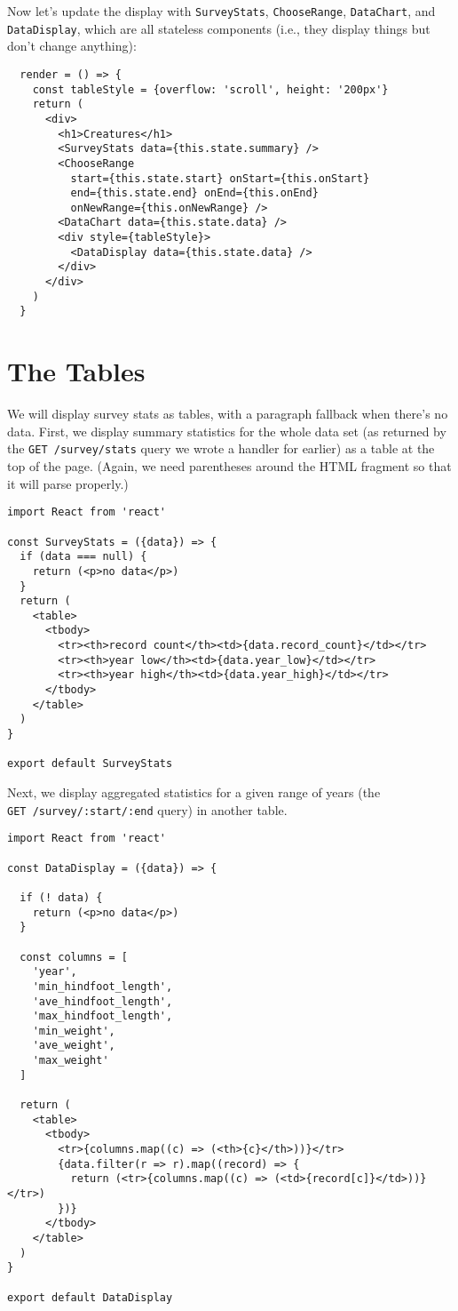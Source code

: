 Now let's update the display with \texttt{SurveyStats},
\texttt{ChooseRange}, \texttt{DataChart}, and \texttt{DataDisplay},
which are all stateless components
(i.e., they display things but don't change anything):

\begin{verbatim}
  render = () => {
    const tableStyle = {overflow: 'scroll', height: '200px'}
    return (
      <div>
        <h1>Creatures</h1>
        <SurveyStats data={this.state.summary} />
        <ChooseRange
          start={this.state.start} onStart={this.onStart}
          end={this.state.end} onEnd={this.onEnd}
          onNewRange={this.onNewRange} />
        <DataChart data={this.state.data} />
        <div style={tableStyle}>
          <DataDisplay data={this.state.data} />
        </div>
      </div>
    )
  }
\end{verbatim}

\section{The Tables}\label{s:capstone-tables}

We will display survey stats as tables,
with a paragraph fallback when there's no data.
First, we display summary statistics for the whole data set
(as returned by the \texttt{GET\ /survey/stats} query we wrote a handler for earlier)
as a table at the top of the page.
(Again, we need parentheses around the HTML fragment so that it will parse properly.)

\begin{verbatim}
import React from 'react'

const SurveyStats = ({data}) => {
  if (data === null) {
    return (<p>no data</p>)
  }
  return (
    <table>
      <tbody>
        <tr><th>record count</th><td>{data.record_count}</td></tr>
        <tr><th>year low</th><td>{data.year_low}</td></tr>
        <tr><th>year high</th><td>{data.year_high}</td></tr>
      </tbody>
    </table>
  )
}

export default SurveyStats
\end{verbatim}

Next, we display aggregated statistics for a given range of years
(the \texttt{GET\ /survey/:start/:end} query)
in another table.

\begin{verbatim}
import React from 'react'

const DataDisplay = ({data}) => {

  if (! data) {
    return (<p>no data</p>)
  }

  const columns = [
    'year',
    'min_hindfoot_length',
    'ave_hindfoot_length',
    'max_hindfoot_length',
    'min_weight',
    'ave_weight',
    'max_weight'
  ]

  return (
    <table>
      <tbody>
        <tr>{columns.map((c) => (<th>{c}</th>))}</tr>
        {data.filter(r => r).map((record) => {
          return (<tr>{columns.map((c) => (<td>{record[c]}</td>))}</tr>)
        })}
      </tbody>
    </table>
  )
}

export default DataDisplay
\end{verbatim}

